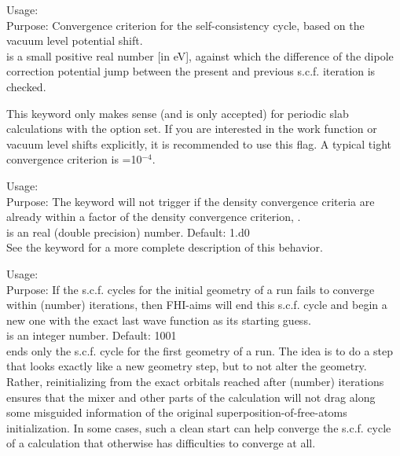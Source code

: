 {
  \noindent
  Usage:   \\[1.0ex]
  Purpose: Convergence criterion for the self-consistency cycle, based
    on the vacuum level potential shift. \\[1.0ex]
   is a small positive real number [in eV], against
  which the difference of the dipole correction potential jump between the present and
  previous s.c.f. iteration is checked. \\
}

This keyword only makes sense (and is only accepted) for periodic slab calculations
with the option  set. If you are interested in the work function or
vacuum level shifts explicitly, it is recommended to use this flag. A typical tight convergence
criterion is =10$^{-4}$.

{
  \noindent
  Usage:   \\[1.0ex]
  Purpose: The  keyword will not trigger
    if the density convergence criteria are already within a factor
     of the density convergence criterion,
    . \\[1.0ex]
   is an real (double precision) number. Default: 1.d0 \\
}
See the  keyword for a more complete description of this
behavior.

{
  \noindent
  Usage:   \\[1.0ex]
  Purpose: If the s.c.f. cycles for the initial geometry of a run
    fails to converge within (number) iterations, then FHI-aims
    will end this s.c.f. cycle and begin a new one with the exact
    last wave function as its starting guess. \\[1.0ex]
   is an integer number. Default: 1001 \\
}
 ends only the s.c.f. cycle for the first
geometry of a run. The idea is to do a step that looks exactly like
a new geometry step, but to not alter the geometry. Rather, reinitializing
from the exact orbitals reached after (number) iterations ensures that
the mixer and other parts of the calculation will not drag along some
misguided information of the original superposition-of-free-atoms
initialization. In some cases, such a clean start can help converge
the s.c.f. cycle of a calculation that otherwise has difficulties to
converge at all.

